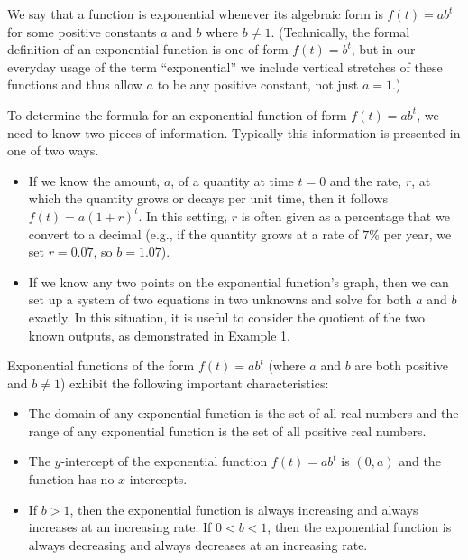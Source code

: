 \documentclass[nooutcomes]{ximera}
\begin{document}
\begin{summary}
\item We say that a function is exponential whenever its algebraic form is \(f(t) = ab^t\) for some positive constants \(a\) and \(b\) where \(b \ne 1\).  (Technically, the formal definition of an exponential function is one of form \(f(t) = b^t\), but in our everyday usage of the term ``exponential'' we include vertical stretches of these functions and thus allow \(a\) to be any positive constant, not just \(a = 1\).)
\item To determine the formula for an exponential function of form \(f(t) = ab^t\), we need to know two pieces of information.  Typically this information is presented in one of two ways.
\begin{itemize}
\item If we know the amount, \(a\), of a quantity at time \(t = 0\) and the rate, \(r\), at which the quantity grows or decays per unit time, then it follows \(f(t) = a(1+r)^t\).  In this setting, \(r\) is often given as a percentage that we convert to a decimal (e.g., if the quantity grows at a rate of \(7\)\% per year, we set \(r = 0.07\), so \(b = 1.07\)).
\item If we know any two points on the exponential function's graph, then we can set up a system of two equations in two unknowns and solve for both \(a\) and \(b\) exactly.  In this situation, it is useful to consider the quotient of the two known outputs, as demonstrated in Example 1.
\end{itemize}
\item Exponential functions of the form \(f(t) = ab^t\) (where \(a\) and \(b\) are both positive and \(b \ne 1\)) exhibit the following important characteristics:
\begin{itemize}
\item The domain of any exponential function is the set of all real numbers and the range of any exponential function is the set of all positive real numbers.
\item The \(y\)-intercept of the exponential function \(f(t) = ab^t\) is \((0,a)\) and the function has no \(x\)-intercepts.
\item If \(b \gt 1\), then the exponential function is always increasing and always increases at an increasing rate.  If \(0 \lt b \lt 1\), then the exponential function is always decreasing and always decreases at an increasing rate.
\end{itemize}
\end{summary}
\end{document}
